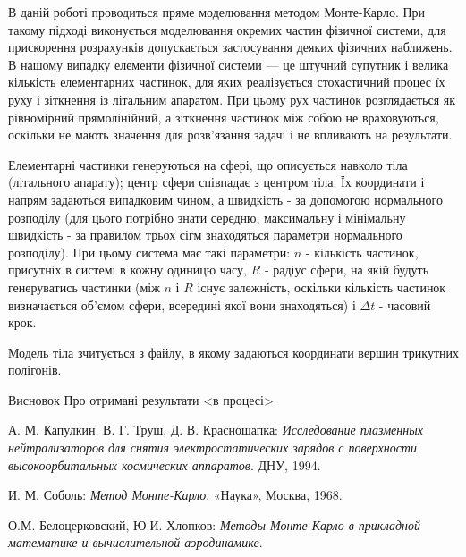 \documentclass[a4paper,12pt]{article}
\begin{document}
В даній роботі проводиться пряме моделювання методом Монте-Карло. При такому підході виконується моделювання окремих частин фізичної системи, для прискорення розрахунків допускається застосування деяких фізичних наближень. В нашому випадку елементи фізичної системи — це штучний супутник і велика кількість елементарних частинок, для яких реалізується стохастичний процес їх руху і зіткнення із літальним апаратом. При цьому рух частинок розглядається як рівномірний прямолінійний, а зіткнення частинок між собою не враховуються, оскільки не мають значення для розв’язання задачі і не впливають на результати.

Елементарні частинки генеруються на сфері, що описується навколо тіла (літального апарату); центр сфери співпадає з центром тіла. Їх координати і напрям задаються випадковим чином, а швидкість - за допомогою нормального розподілу (для цього потрібно знати середню, максимальну і мінімальну швидкість - за правилом трьох сігм знаходяться параметри нормального розподілу). При цьому система має такі параметри: $n$ - кількість частинок, присутніх в системі в кожну одиницю часу, $R$ - радіус сфери, на якій будуть генеруватись частинки (між $n$ і $R$ існує залежність, оскільки кількість частинок визначається об’ємом сфери, всередині якої вони знаходяться) і $\Delta t$ - часовий крок.

Модель тіла зчитується з файлу, в якому задаються координати вершин трикутних полігонів. 

Висновок
Про отримані результати <в процесі>

\begin{thebibliography}{9}

  А. М. Капулкин, В. Г. Труш, Д. В. Красношапка:
  \emph{Исследование плазменных нейтрализаторов для снятия электростатических зарядов с поверхности высокоорбитальных космических аппаратов}.
  ДНУ, 1994.

  И. М. Соболь:
  \emph{Метод Монте-Карло}.
  «Наука», Москва, 1968.

  О.М. Белоцерковский, Ю.И. Хлопков:
  \emph{Методы Монте-Карло в прикладной математике и вычислительной аэродинамике}.

\end{thebibliography}
      
\end{document}

